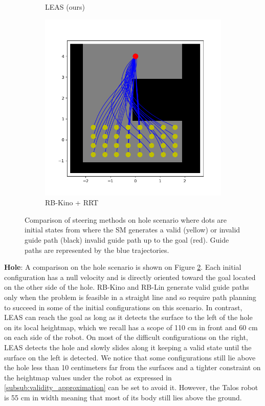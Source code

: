 \begin{figure}
\begin{subfigure}[t]{0.49\linewidth}
    \caption{LEAS (ours)}
    \end{subfigure}
    \begin{subfigure}[t]{0.49\linewidth}
    \includegraphics[width=\textwidth]{Figures/Chapter_LEAS/hole_p1_kino_rrt.png}
    \caption{RB-Kino + RRT}
    \label{fig:leas:hole_scenarios_Kino_RRT}
    \end{subfigure}
    \caption{Comparison of steering methods on hole scenario where dots are initial states from where the SM generates a valid (yellow) or invalid guide path (black) invalid guide path up to the goal (red). Guide paths are represented by the blue trajectories.}
    \label{fig:leas:hole_scenarios}
\end{figure}

\textbf{Hole}: A comparison on the hole scenario is shown on Figure \ref{fig:leas:hole_scenarios}. Each initial configuration has a null velocity and is directly oriented toward the goal located on the other side of the hole. 
RB-Kino and RB-Lin generate valid guide paths only when the problem is feasible in a straight line and so require path planning to succeed in some of the initial configurations on this scenario.
In contrast, LEAS can reach the goal as long as it detects the surface to the left of the hole on its local heightmap, which we recall has a scope of 110 cm in front and 60 cm on each side of the robot. 
On most of the difficult configurations on the right, LEAS detects the hole and slowly slides along it keeping a valid state until the surface on the left is detected.
We notice that some configurations still lie above the hole less than 10 centimeters far from the surfaces and a tighter constraint on the heightmap values under the robot as expressed in \ref{subsub:validity_approximation} can be set to avoid it. However, the Talos robot is 55 cm in width meaning that most of its body still lies above the ground.

